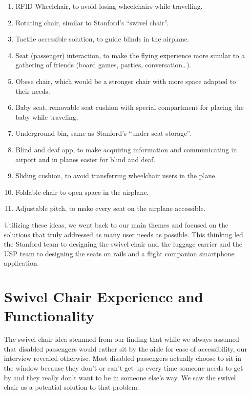 \documentclass[a4paper, 12pt,conference]{new_cit_thesis}
\begin{document}
\begin{enumerate}
 \item{RFID Wheelchair, to avoid losing wheelchairs while travelling.}
 \item{Rotating chair, similar to Stanford’s “swivel chair”.}
 \item{Tactile accessible solution, to guide blinds in the airplane.}
 \item{Seat (passenger) interaction, to make the flying experience more similar to a gathering of friends (board games, parties, conversation…).}
 \item{Obese chair, which would be a stronger chair with more space adapted to their needs.}
 \item{Baby seat, removable seat cushion with special compartment for placing the baby while traveling.}
 \item{Underground bin, same as Stanford’s “under-seat storage”.}
 \item{Blind and deaf app, to make acquiring information and communicating in airport and in planes easier for blind and deaf.}
 \item{Sliding cushion, to avoid transferring wheelchair users in the plane.}
 \item{Foldable chair to open space in the airplane.}
 \item{Adjustable pitch, to make every seat on the airplane accessible.}
\end{enumerate}
Utilizing these ideas, we went back to our main themes and focused on the solutions that truly addressed as many user needs as possible. This thinking led the Stanford team to designing the swivel chair and the luggage carrier and the USP team to designing the seats on rails and a flight companion smartphone application.

\section{Swivel Chair Experience and Functionality}
The swivel chair idea stemmed from our finding that while we always assumed that disabled passengers would rather sit by the aisle for ease of accessibility, our interview revealed otherwise. Most disabled passengers actually choose to sit in the window because they don’t or can’t get up every time someone needs to get by and they really don’t want to be in someone else’s way. We saw the swivel chair as a potential solution to that problem.
\end{document}
